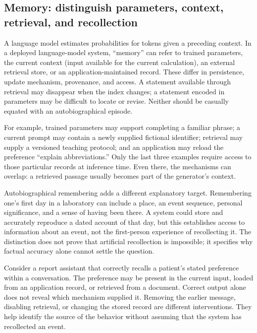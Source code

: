 \documentclass[11pt,a4paper]{article}
\begin{document}

\subsection{Memory: distinguish parameters, context, retrieval, and recollection}
A language model estimates probabilities for tokens given a preceding context. In a deployed language-model system, ``memory'' can refer to trained parameters, the current context (input available for the current calculation), an external retrieval store, or an application-maintained record. These differ in persistence, update mechanism, provenance, and access. A statement available through retrieval may disappear when the index changes; a statement encoded in parameters may be difficult to locate or revise. Neither should be casually equated with an autobiographical episode.

For example, trained parameters may support completing a familiar phrase; a current prompt may contain a newly supplied fictional identifier; retrieval may supply a versioned teaching protocol; and an application may reload the preference ``explain abbreviations.'' Only the last three examples require access to those particular records at inference time. Even there, the mechanisms can overlap: a retrieved passage usually becomes part of the generator's context.

Autobiographical remembering adds a different explanatory target. Remembering one's first day in a laboratory can include a place, an event sequence, personal significance, and a sense of having been there. A system could store and accurately reproduce a dated account of that day, but this establishes access to information about an event, not the first-person experience of recollecting it. The distinction does not prove that artificial recollection is impossible; it specifies why factual accuracy alone cannot settle the question.

Consider a report assistant that correctly recalls a patient's stated preference within a conversation. The preference may be present in the current input, loaded from an application record, or retrieved from a document. Correct output alone does not reveal which mechanism supplied it. Removing the earlier message, disabling retrieval, or changing the stored record are different interventions. They help identify the source of the behavior without assuming that the system has recollected an event.
\end{document}
